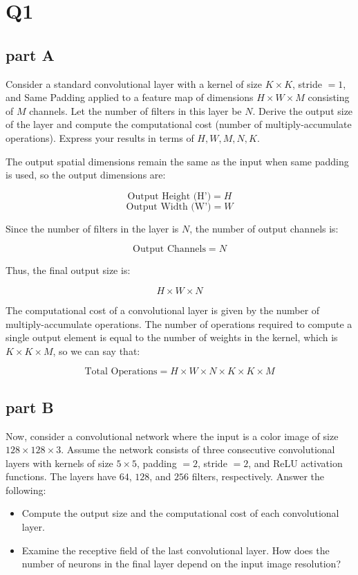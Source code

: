 \section{Q1}
\subsection{part A}
Consider a standard convolutional layer with a kernel of size $K \times K$, stride $= 1$, and Same Padding applied to a feature map of dimensions $H \times W \times M$ consisting of $M$ channels. Let the number of filters in this layer be $N$. Derive the output size of the layer and compute the computational cost (number of multiply-accumulate operations). Express your results in terms of $H, W, M, N, K$.
    
\begin{qsolve}
    \begin{qsolve}[]
        The output spatial dimensions remain the same as the input when same padding is used, so the output dimensions are:

        \[
        \text{Output Height (H')} = H
        \]
        \[
        \text{Output Width (W')} = W
        \]

        Since the number of filters in the layer is $N$, the number of output channels is:

        \[
        \text{Output Channels} = N
        \]

        Thus, the final output size is:

        \[
        H \times W \times N
        \]
        
        The computational cost of a convolutional layer is given by the number of multiply-accumulate operations. The number of operations required to compute a single output element is equal to the number of weights in the kernel, which is $K \times K \times M$, so we can say that:

        \[
        \text{Total Operations} = H \times W \times N \times K \times K \times M
        \]

    \end{qsolve}
\end{qsolve}
    
\subsection{part B}
Now, consider a convolutional network where the input is a color image of size $128 \times 128 \times 3$. Assume the network consists of three consecutive convolutional layers with kernels of size $5 \times 5$, padding $= 2$, stride $= 2$, and ReLU activation functions. The layers have $64$, $128$, and $256$ filters, respectively. Answer the following:
\begin{itemize}
    \item Compute the output size and the computational cost of each convolutional layer.
    \item Examine the receptive field of the last convolutional layer. How does the number of neurons in the final layer depend on the input image resolution?
\end{itemize}

